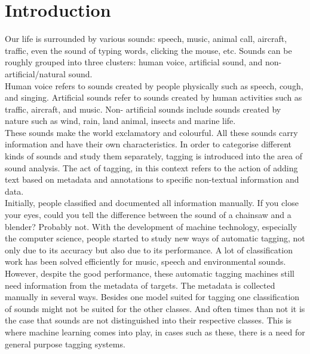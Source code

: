 \documentclass{article} %
\begin{document}
\section*{Introduction}
    Our life is surrounded by various sounds: speech, music, animal call, aircraft, traffic, even the sound of typing words, clicking the mouse, etc. Sounds can be roughly grouped into three clusters: human voice, artificial sound, and non-artificial/natural sound.\\
    \newline
    Human voice refers to sounds created by people physically such as speech, cough, and singing. Artificial sounds refer to sounds created by human activities such as traffic, aircraft, and music. Non- artificial sounds include sounds created by nature such as wind, rain, land animal, insects and marine life.\\
    \newline
    These sounds make the world exclamatory and colourful. All these sounds carry information and have their own characteristics. In order to categorise different kinds of sounds and study them separately, tagging is introduced into the area of sound analysis. The act of tagging, in this context refers to the action of adding text based on metadata and annotations to specific non-textual information and data.\\
    \newline
    Initially, people classified and documented all information manually. If you close your eyes, could you tell the difference between the sound of a chainsaw and a blender? Probably not. With the development of machine technology, especially the computer science, people started to study new ways of automatic tagging, not only due to its accuracy but also due to its performance. A lot of classification work has been solved efficiently for music, speech and environmental sounds.\\
    \newline
    However, despite the good performance, these automatic tagging machines still need information from the metadata of targets. The metadata is collected manually in several ways. Besides one model suited for tagging one classification of sounds might not be suited for the other classes. And often times than not it is the case that sounds are not distinguished into their respective classes. This is where machine learning comes into play, in cases such as these, there is a need for general purpose tagging systems.
\end{document}

